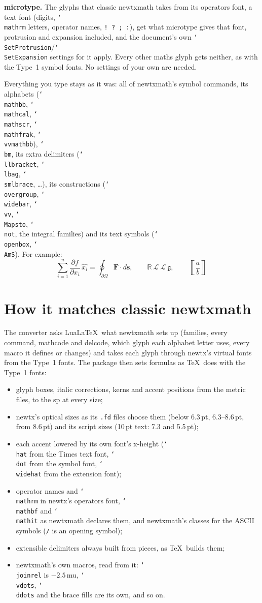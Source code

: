 \documentclass[11pt,a4paper]{article}
\newcommand\cs[1]{\texttt{\char`\\#1}}
\begin{document}
\textbf{microtype.} The glyphs that classic \textsf{newtxmath} takes from its operators font,
a text font (digits, \cs{mathrm} letters, operator names, \texttt{! ? ; :}), get what
\textsf{microtype} gives that font, protrusion and expansion included, and the
document's own \cs{SetProtrusion}/\cs{SetExpansion} settings for it apply. Every other maths
glyph gets neither, as with the Type~1 symbol fonts. No settings of your own are needed.

Everything you type stays as it was: all of \textsf{newtxmath}'s symbol commands, its
alphabets (\cs{mathbb}, \cs{mathcal}, \cs{mathscr}, \cs{mathfrak}, \cs{vvmathbb}),
\cs{bm}, its extra delimiters (\cs{llbracket}, \cs{lbag}, \cs{smlbrace}, \ldots), its
constructions (\cs{overgroup}, \cs{widebar}, \cs{vv}, \cs{Mapsto}, \cs{not}, the integral
families) and its text symbols (\cs{openbox}, \cs{AmS}). For example:
\[ \sum_{i=1}^n \frac{\partial f}{\partial x_i}\,\widehat{x_i}
   = \oint_{\partial\Omega} \bm{F}\cdot d\bm{s},\qquad
   \mathbb{R}\ \mathcal{L}\ \mathscr{L}\ \mathfrak{g},\qquad
   \left\llbracket \frac{a}{b} \right\rrbracket \]

\section{How it matches classic newtxmath}
The converter asks Lua\LaTeX\ what \textsf{newtxmath} sets up (families, every command,
mathcode and delcode, which glyph each alphabet letter uses, every macro it defines or
changes) and takes each glyph through \textsf{newtx}'s virtual fonts from the Type~1 fonts.
The package then sets formulas as \TeX\ does with the Type~1 fonts:
\begin{itemize}
\item glyph boxes, italic corrections, kerns and accent positions from the metric files, to
  the sp at every size;
\item \textsf{newtx}'s optical sizes as its \texttt{.fd} files choose them (below 6.3\,pt,
  6.3--8.6\,pt, from 8.6\,pt) and its script sizes (10\,pt text: 7.3 and 5.5\,pt);
\item each accent lowered by its own font's x-height (\cs{hat} from the Times text font,
  \cs{dot} from the symbol font, \cs{widehat} from the extension font);
\item operator names and \cs{mathrm} in \textsf{newtx}'s operators font, \cs{mathbf} and
  \cs{mathit} as \textsf{newtxmath} declares them, and \textsf{newtxmath}'s classes for the
  ASCII symbols (\texttt{/} is an opening symbol);
\item extensible delimiters always built from pieces, as \TeX\ builds them;
\item \textsf{newtxmath}'s own macros, read from it: \cs{joinrel} is $-2.5$\,mu,
  \cs{vdots}, \cs{ddots} and the brace fills are its own, and so on.
\end{itemize}
\end{document}
